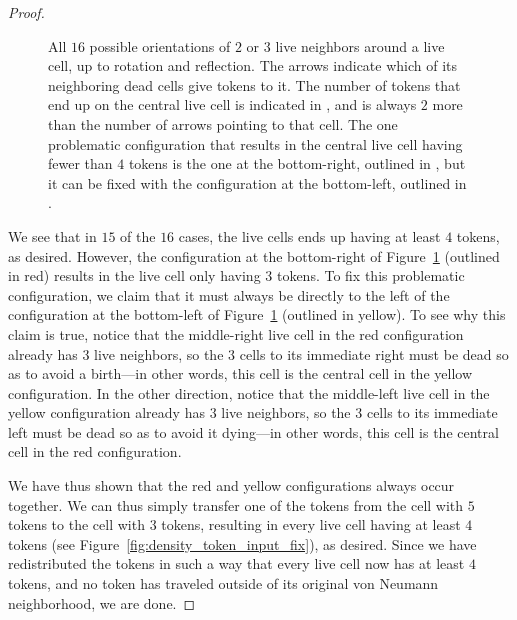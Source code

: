 \begin{proof}
\begin{figure}[!htb]
		\caption{All $16$ possible orientations of $2$ or $3$ live neighbors around a live cell, up to rotation and reflection. The  arrows indicate which of its neighboring dead cells give tokens to it. The number of tokens that end up on the central live cell is indicated in , and is always $2$ more than the number of arrows pointing to that cell. The one problematic configuration that results in the central live cell having fewer than $4$ tokens is the one at the bottom-right, outlined in , but it can be fixed with the configuration at the bottom-left, outlined in .}\label{fig:density_token_input}
	\end{figure}
	
	We see that in $15$ of the $16$ cases, the live cells ends up having at least $4$ tokens, as desired. However, the configuration at the bottom-right of Figure~\ref{fig:density_token_input} (outlined in red) results in the live cell only having $3$ tokens. To fix this problematic configuration, we claim that it must always be directly to the left of the configuration at the bottom-left of Figure~\ref{fig:density_token_input} (outlined in yellow). To see why this claim is true, notice that the middle-right live cell in the red configuration already has $3$ live neighbors, so the $3$ cells to its immediate right must be dead so as to avoid a birth---in other words, this cell is the central cell in the yellow configuration. In the other direction, notice that the middle-left live cell in the yellow configuration already has $3$ live neighbors, so the $3$ cells to its immediate left must be dead so as to avoid it dying---in other words, this cell is the central cell in the red configuration.
	
	We have thus shown that the red and yellow configurations always occur together. We can thus simply transfer one of the tokens from the cell with $5$ tokens to the cell with $3$ tokens, resulting in every live cell having at least $4$ tokens (see Figure~\ref{fig:density_token_input_fix}), as desired. Since we have redistributed the tokens in such a way that every live cell now has at least $4$ tokens, and no token has traveled outside of its original von Neumann neighborhood, we are done.
\end{proof}

